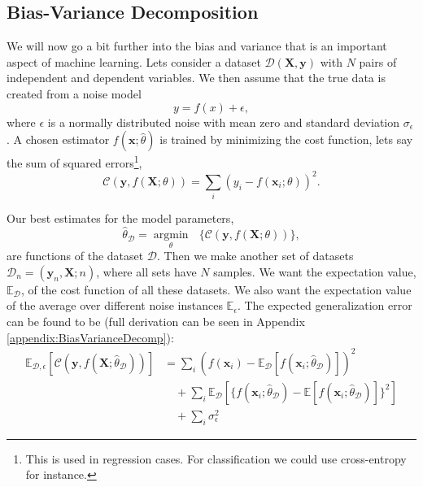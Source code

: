 \documentclass[a4paper, american, 12pt]{report}
\DeclareMathOperator*{\argmin}{argmin}
\begin{document}
	
	\subsection{Bias-Variance Decomposition}
	\label{subsect:Theory-BiasVarianceDecomp}
	We will now go a bit further into the bias and variance that is an important aspect of machine learning. Lets consider a dataset $\mathcal{D}(\textbf{X},\textbf{y})$ with $N$ pairs of independent and dependent variables. We then assume that the true data is created from a noise model 
	\begin{equation}
		y=f(x)+\epsilon,
	\end{equation}
	where $\epsilon$ is a normally distributed noise with mean zero and standard deviation $\sigma_{\epsilon}$. A chosen estimator $f(\textbf{x};\hat{\theta})$ is trained by minimizing the cost function, lets say the sum of squared errors\footnote{This is used in regression cases. For classification we could use cross-entropy for instance.}, 
	\begin{equation}
		\mathcal{C}(\textbf{y}, f(\textbf{X};\theta))=\sum_{i}(y_i-f(\textbf{x}_i;\theta))^2.
	\end{equation}
	
	Our best estimates for the model parameters,
	\begin{equation}
		\hat{\theta}_{\mathcal{D}}=\underset{\theta}{\argmin}\text{ } \{\mathcal{C}(\textbf{y},f(\textbf{X};\theta))\},
	\end{equation}
	are functions of the dataset $\mathcal{D}$. Then we make another set of datasets $\mathcal{D}_n=(\textbf{y}_n,\textbf{X};n)$, where all sets have $N$ samples. We want the expectation value, $\mathds{E}_{\mathcal{D}}$, of the cost function of all these datasets. We also want the expectation value of the average over different noise instances $\mathds{E}_{\epsilon}$. The expected generalization error can be found to be (full derivation can be seen in Appendix \ref{appendix:BiasVarianceDecomp}):
	\begin{align}
	\label{eq:ExpctGenError}
		\mathds{E}_{\mathcal{D},\epsilon}[\mathcal{C}(\textbf{y}, f(\textbf{X};\hat{\theta}_{\mathcal{D}}))]&= \sum_i(f(\textbf{x}_i)-\mathds{E}_{\mathcal{D}}[f(\textbf{x}_i;\hat{\theta}_{\mathcal{D}})])^2 \nonumber\\
		& \quad +\sum_i \mathds{E}_{\mathcal{D}}[\{f(\textbf{x}_i;\hat{\theta}_{\mathcal{D}})-\mathds{E}[f(\textbf{x}_i;\hat{\theta}_{\mathcal{D}})]\}^2] 
		\nonumber\\
		& \quad + \sum_{i}\sigma_{\epsilon}^2
	\end{align}
	
\end{document}

